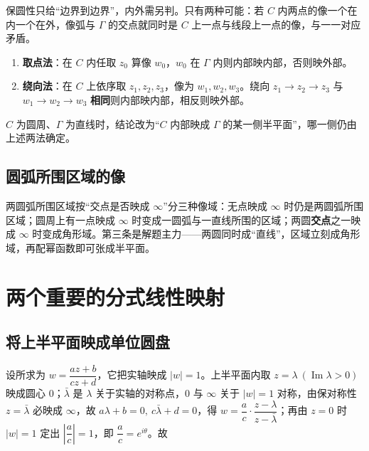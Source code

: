 保圆性只给“边界到边界”，内外需另判。只有两种可能：若 \(C\) 内两点的像一个在内一个在外，像弧与 \(\Gamma\) 的交点就同时是 \(C\) 上一点与线段上一点的像，与一一对应矛盾。

\begin{enumerate}
    \item \textbf{取点法}：在 \(C\) 内任取 \(z_{0}\) 算像 \(w_{0}\)，\(w_{0}\) 在 \(\Gamma\) 内则内部映内部，否则映外部。
    \item \textbf{绕向法}：在 \(C\) 上依序取 \(z_{1},z_{2},z_{3}\)，像为 \(w_{1},w_{2},w_{3}\)。绕向 \(z_{1}\to z_{2}\to z_{3}\) 与 \(w_{1}\to w_{2}\to w_{3}\) \textbf{相同}则内部映内部，相反则映外部。
\end{enumerate}

\(C\) 为圆周、\(\Gamma\) 为直线时，结论改为“\(C\) 内部映成 \(\Gamma\) 的某一侧半平面”，哪一侧仍由上述两法确定。

\subsection{圆弧所围区域的像}

两圆弧所围区域按“交点是否映成 \(\infty\)”分三种像域：无点映成 \(\infty\) 时仍是两圆弧所围区域；圆周上有一点映成 \(\infty\) 时变成一圆弧与一直线所围的区域；两圆\textbf{交点}之一映成 \(\infty\) 时变成角形域。第三条是解题主力——两圆同时成“直线”，区域立刻成角形域，再配幂函数即可张成半平面。


\section{两个重要的分式线性映射}

\subsection{将上半平面映成单位圆盘}

设所求为 \(w=\dfrac{az+b}{cz+d}\)，它把实轴映成 \(|w|=1\)。上半平面内取 \(z=\lambda\ (\operatorname{Im}\lambda>0)\) 映成圆心 \(0\)；\(\bar\lambda\) 是 \(\lambda\) 关于实轴的对称点，\(0\) 与 \(\infty\) 关于 \(|w|=1\) 对称，由保对称性 \(z=\bar\lambda\) 必映成 \(\infty\)，故 \(a\lambda+b=0,\ c\bar\lambda+d=0\)，得 \(w=\dfrac{a}{c}\cdot\dfrac{z-\lambda}{z-\bar\lambda}\)；再由 \(z=0\) 时 \(|w|=1\) 定出 \(\left|\dfrac{a}{c}\right|=1\)，即 \(\dfrac{a}{c}=e^{i\theta}\)。故

